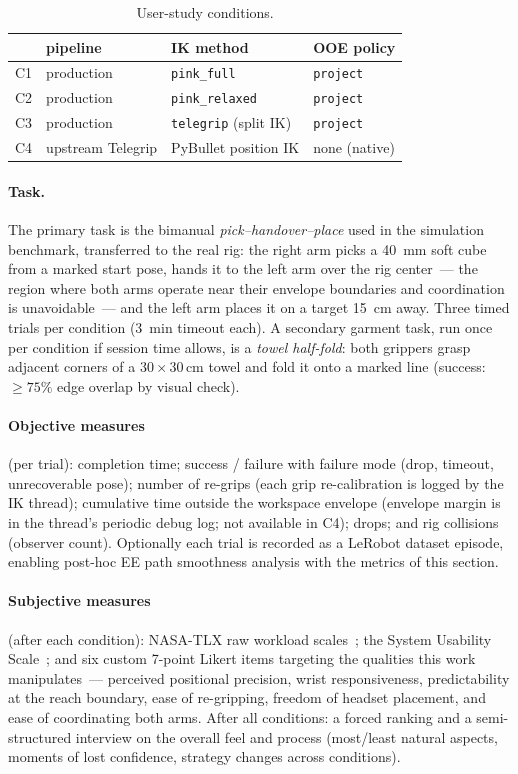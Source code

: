 \begin{table}[h]
  \centering
  \caption{User-study conditions.}
  \label{tab:userstudy-conditions}
  \small
  \begin{tabular}{llll}
    \toprule
    & pipeline & IK method & OOE policy \\
    \midrule
    C1 & production & \texttt{pink\_full} & \texttt{project} \\
    C2 & production & \texttt{pink\_relaxed} & \texttt{project} \\
    C3 & production & \texttt{telegrip} (split IK) & \texttt{project} \\
    C4 & upstream Telegrip & PyBullet position IK & none (native) \\
    \bottomrule
  \end{tabular}
\end{table}

\paragraph{Task.}
The primary task is the bimanual \emph{pick--handover--place} used in the
simulation benchmark, transferred to the real rig: the right arm picks a
\SI{40}{mm} soft cube from a marked start pose, hands it to the left arm
over the rig center~--- the region where both arms operate near their
envelope boundaries and coordination is unavoidable~--- and the left arm
places it on a target \SI{15}{cm} away. Three timed trials per condition
(\SI{3}{min} timeout each). A secondary garment task, run once per
condition if session time allows, is a \emph{towel half-fold}: both
grippers grasp adjacent corners of a \(30\times30\)\,cm towel and fold it
onto a marked line (success: \(\ge75\%\) edge overlap by visual check).

\paragraph{Objective measures} (per trial): completion time; success /
failure with failure mode (drop, timeout, unrecoverable pose); number of
re-grips (each grip re-calibration is logged by the IK thread); cumulative
time outside the workspace envelope (envelope margin is in the thread's
periodic debug log; not available in C4); drops; and rig collisions
(observer count). Optionally each trial is recorded as a LeRobot dataset
episode, enabling post-hoc EE path smoothness analysis with the metrics of
this section.

\paragraph{Subjective measures} (after each condition): NASA-TLX raw
workload scales~\citep{nasatlx}; the System Usability
Scale~\citep{sus}; and six custom 7-point Likert items targeting the
qualities this work manipulates~--- perceived positional precision, wrist
responsiveness, predictability at the reach boundary, ease of re-gripping,
freedom of headset placement, and ease of coordinating both arms. After
all conditions: a forced ranking and a semi-structured interview on the
overall feel and process (most/least natural aspects, moments of lost
confidence, strategy changes across conditions).

